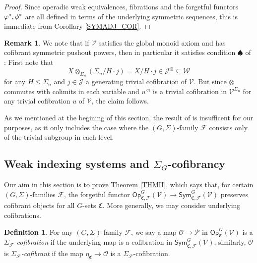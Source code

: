 \documentclass[a4paper,10pt
,draft
]{article}%
\numberwithin{equation}{section}
\numberwithin{figure}{section}
\theoremstyle{definition} %
\newtheorem{definition}[equation]{Definition}%
\newtheorem{remark}[equation]{Remark}%
\newcommand{\Sym}{\ensuremath{\mathsf{Sym}}}%
\newcommand{\Op}{\mathsf{Op}}%
\newcommand{\F}{\ensuremath{\mathcal F}}
\newcommand{\V}{\ensuremath{\mathcal V}}
\renewcommand{\O}{\ensuremath{\mathcal O}}
\renewcommand{\P}{\ensuremath{\mathcal P}}
\newcommand{\1}{\ensuremath{\mathbbm 1}}%
\begin{document}
\begin{proof}
	Since operadic weak equivalences, fibrations and the forgetful functors $\varphi^{\**},\phi^{\**}$
	are all defined in terms of the underlying symmetric sequences,
	this is immediate from Corollary \ref{SYMADJ_COR}.
\end{proof}












\begin{remark}
      We note that if $\V$ satisfies the global monoid axiom and has cofibrant symmetric pushout powers,
      then in particular it satisfies condition $\spadesuit$ of \cite[Thm. 6.1.1]{WY18}:
      First note that
      \[
            X \otimes_{\Sigma_n} (\Sigma_n / H \cdot j) = X/H \cdot j \in \mathcal J^{\otimes} \subseteq \mathcal W
      \]
      for any $H \leq \Sigma_n$ and $j \in \mathcal J$ a generating trivial cofibration of $\V$.
      But since $\otimes$ commutes with colimits in each variable
      and $u^{\square n}$ is a trivial cofibration in $\V^{\Sigma_n}$ for any trivial cofibration $u$ of $\V$,
      the claim follows.

      As we mentioned at the begining of this section, the result of \cite[Thm. 6.1.1]{WY18} is insufficent for our purposes,
      as it only includes the case where
      the $(G,\Sigma)$-family $\F$ consists only of the trivial subgroup in each level.
\end{remark}





\newpage
\subsection{Weak indexing systems and $\Sigma_G$-cofibrancy}
\label{INDSYS SEC}


Our aim in this section is to prove Theorem \ref{THMII},
which says that, for certain $(G,\Sigma)$-families $\F$, the forgetful functor
$\Op^G_{\mathfrak C, \F}(\V) \to \Sym^G_{\mathfrak C, \F}(\V)$ preserves cofibrant objects for all $G$-sets $\mathfrak C$.
More generally, we may consider underlying cofibrations.

\begin{definition}
      For any $(G,\Sigma)$-family $\F$, we say a map $\O \to \P$ in $\Op^G_{\mathfrak C}(\V)$
      is a \textit{$\Sigma_\F$-cofibration}
      if the underlying map is a cofibration in $\Sym^G_{\mathfrak C, \F}(\V)$;
      similarly, $\O$ is \textit{$\Sigma_\F$-cofibrant} if the map $\eta_{\mathfrak C} \to \O$ is a $\Sigma_\F$-cofibration.
\end{definition}
\end{document}
